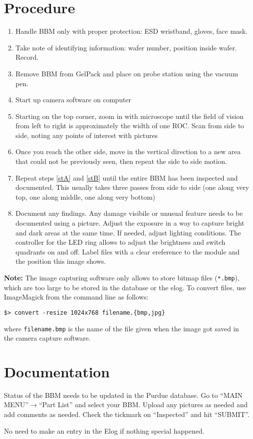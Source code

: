 \documentclass[12pt]{unlsilabsop}
\begin{document}
\section{Procedure}

\begin{enumerate}
    \item Handle BBM only with proper protection: ESD wristband, gloves, face mask.
    \item Take note of identifying information: wafer number, position inside wafer. Record.
    \item Remove BBM from GelPack and place on probe station using the vacuum pen. 
    \item Start up camera software on computer
    \item \label{stA} Starting on the top corner, zoom in with microscope until the field of vision from left to right is approximately the width of one ROC.  Scan from side to side, noting any points of interest with pictures
    \item \label{stB} Once you reach the other side, move in the vertical direction to a new area that could not be previously seen, then repeat the side to side motion.
    \item Repeat steps \ref{stA} and \ref{stB} until the entire BBM has been inspected and documented.  This usually takes three passes from side to side (one along very top, one along middle, one along very bottom)
    \item Document any findings. Any damage visibile or unusual feature needs to be documented using a picture. Adjust the exposure in a way to capture bright and dark areas at the same time. If needed, adjust lighting conditions. The controller for the LED ring allows to adjust the brightness and switch quadrants on and off. Label files with a clear ereference to the module and the position this image shows.
\end{enumerate}
\textbf{Note:} The image capturing software only allows to store bitmap files (\texttt{*.bmp}), which are too large to be stored in the database or the elog. To convert files, use ImageMagick from the command line as follows:

\medskip

\texttt{\$> convert -resize 1024x768 filename.\{bmp,jpg\}}

\medskip

where \texttt{filename.bmp} is the name of the file given when the image got saved in the camera capture software.

\section{Documentation}
Status of the BBM needs to be updated in the Purdue database. Go to ``MAIN MENU''$\rightarrow$``Part List'' and select your BBM. Upload any pictures as needed and add comments as needed. Check the tickmark on ``Inspected'' and hit ``SUBMIT''. 

No need to make an entry in the Elog if nothing special happened.
\end{document}
